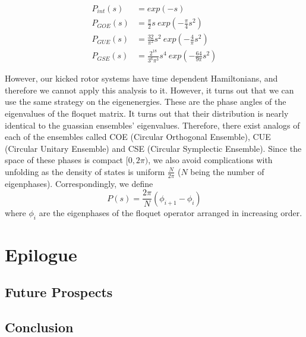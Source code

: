 \documentclass[twocolumn,nobalancelastpage]{report}
\begin{document}
\begin{align}
    P_{int}(s) &= exp(-s)\\
    P_{GOE}(s) &= \frac{\pi}{2} s\ exp\left(-\frac{\pi}{4}s^2\right)\\
    P_{GUE}(s) &= \frac{32}{\pi^2} s^2\ exp\left(-\frac{4}{\pi}s^2\right)\\
    P_{GSE}(s) &= \frac{2^{18}}{3^6 \pi^3} s^4\ exp\left(-\frac{64}{9\pi}s^2\right)
\end{align}

However, our kicked rotor systems have time dependent Hamiltonians, and
therefore we cannot apply this analysis to it. However, it turns out that
we can use the same strategy on the eigenenergies. These are the phase
angles of the eigenvalues of the floquet matrix. It turns out that their
distribution is nearly identical to the guassian ensembles' eigenvalues.
Therefore, there exist analogs of each of the ensembles called COE
(Circular Orthogonal Ensemble), CUE (Circular Unitary Ensemble) and
CSE (Circular Symplectic Ensemble). Since the space of these phases is
compact $[0, 2\pi)$, we also avoid complications with unfolding as the
density of states is uniform $\frac{N}{2\pi}$ ($N$ being the number
of eigenphases). Correspondingly, we define
\begin{equation}
P(s) = \frac{2\pi}{N} (\phi_{i+1} - \phi_i)
\end{equation}
where $\phi_i$ are the eigenphases of the floquet operator arranged in
increasing order.

\chapter{Epilogue}
\section{Future Prospects}

\section{Conclusion}

\printbibliography
\end{document}
